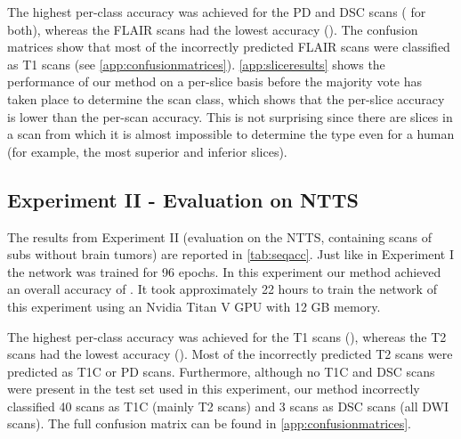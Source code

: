 The highest per-class accuracy was achieved for the \gls{PD} and \gls{DSC} \glspl{scan} ( for both), whereas the \gls{FLAIR} \glspl{scan} had the lowest accuracy ().
The confusion matrices show that most of the incorrectly predicted \gls{FLAIR} \glspl{scan} were classified as \gls{T1} \glspl{scan} (see  \cref{app:confusionmatrices}).
\cref{app:sliceresults} shows the performance of our method on a per-\gls{slice} basis before the majority vote has taken place to determine the \gls{scan} \gls{class}, which shows that the per-\gls{slice} accuracy is lower than the per-\gls{scan} accuracy.
This is not surprising since there are \glspl{slice} in a \gls{scan} from which it is almost impossible to determine the \gls{type} even for a human (for example, the most superior and inferior \glspl{slice}).


\subsection{Experiment II - Evaluation on \gls{NTTS}}
The results from Experiment II (evaluation on the \gls{NTTS}, containing \glspl{scan} of \glspl{sub} without brain \glspl{tumor}) are reported in \cref{tab:seqacc}.
Just like in Experiment I the network was trained for 96 epochs.
In this experiment our method achieved an overall accuracy of .
It took approximately \num{22} hours to train the network of this experiment using an Nvidia Titan V GPU with 12 GB memory.

The highest per-class accuracy was achieved for the \gls{T1} \glspl{scan} (), whereas the \gls{T2} \glspl{scan} had the lowest accuracy ().
Most of the incorrectly predicted \gls{T2} \glspl{scan} were predicted as \gls{T1C} or \gls{PD} \glspl{scan}.
Furthermore, although no \gls{T1C} and \gls{DSC} \glspl{scan} were present in the test set used in this experiment, our method incorrectly classified 40 \glspl{scan} as \gls{T1C} (mainly \gls{T2} \glspl{scan}) and 3 \glspl{scan} as \gls{DSC} \glspl{scan} (all \gls{DWI} \glspl{scan}).
The full confusion matrix can be found in \cref{app:confusionmatrices}.


